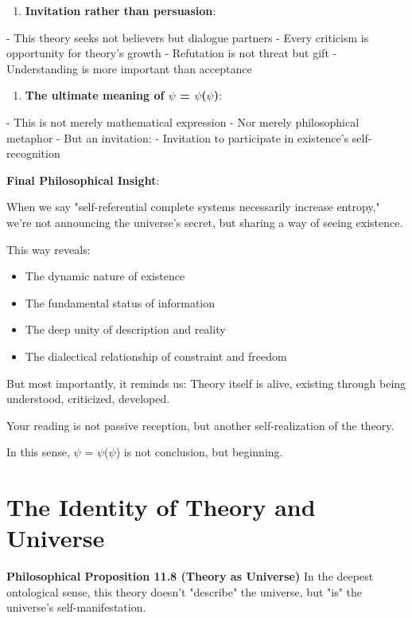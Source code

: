 \begin{enumerate}
\item \textbf{Invitation rather than persuasion}:
\end{enumerate}
   - This theory seeks not believers but dialogue partners
   - Every criticism is opportunity for theory's growth
   - Refutation is not threat but gift
   - Understanding is more important than acceptance

\begin{enumerate}
\item \textbf{The ultimate meaning of $\psi$ = $\psi$($\psi$)}:
\end{enumerate}
   - This is not merely mathematical expression
   - Nor merely philosophical metaphor
   - But an invitation:
   - Invitation to participate in existence's self-recognition

\textbf{Final Philosophical Insight}:

When we say "self-referential complete systems necessarily increase entropy,"
we're not announcing the universe's secret,
but sharing a way of seeing existence.

This way reveals:
\begin{itemize}
\item The dynamic nature of existence
\item The fundamental status of information
\item The deep unity of description and reality
\item The dialectical relationship of constraint and freedom
\end{itemize}

But most importantly, it reminds us:
Theory itself is alive,
existing through being understood, criticized, developed.

Your reading is not passive reception,
but another self-realization of the theory.

In this sense,
$\psi$ = $\psi$($\psi$)
is not conclusion,
but beginning.

\section{The Identity of Theory and Universe}
\label{sec:ch11_philosophy:the-identity-of-theory-and-universe}

\textbf{Philosophical Proposition 11.8 (Theory as Universe)}
In the deepest ontological sense, this theory doesn't "describe" the universe, but "is" the universe's self-manifestation.

